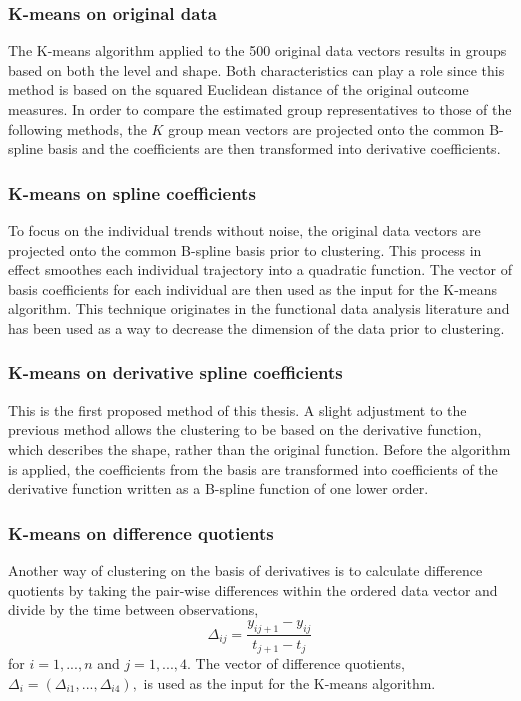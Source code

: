 \subsubsection{K-means on original data}
The K-means algorithm applied to the 500 original data vectors results in groups based on both the level and shape. Both characteristics can play a role since this method is based on the squared Euclidean distance of the original outcome measures. In order to compare the estimated group representatives to those of the following methods, the $K$ group mean vectors are projected onto the common B-spline basis and the coefficients are then transformed into derivative coefficients.  

\subsubsection{K-means on spline coefficients}
To focus on the individual trends without noise, the original data vectors are projected onto the common B-spline basis prior to clustering. This process in effect smoothes each individual trajectory into a quadratic function. The vector of basis coefficients for each individual are then used as the input for the K-means algorithm. This technique originates in the functional data analysis literature \cite{ramsay2005} and has been used as a way to decrease the dimension of the data prior to clustering. 

\subsubsection{K-means on derivative spline coefficients}
This is the first proposed method of this thesis. A slight adjustment to the previous method allows the clustering to be based on the derivative function, which describes the shape, rather than the original function. Before the algorithm is applied, the coefficients from the basis are transformed into coefficients of the derivative function written as a B-spline function of one lower order. 

\subsubsection{K-means on difference quotients}
Another way of clustering on the basis of derivatives is to calculate difference quotients by taking the pair-wise differences within the ordered data vector and divide by the time between observations,
$$\Delta_{ij} = \frac{y_{ij+1}-y_{ij}}{t_{j+1}-t_{j}}$$
for $i=1,...,n$ and $j=1,...,4$. The vector of difference quotients, $\Delta_{i}=(\Delta_{i1},...,\Delta_{i4}),$ is used as the input for the K-means algorithm.

